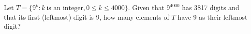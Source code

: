Let $T = \{9^k : k \ \text{is an integer}, 0 \le k \le 4000\}$.  Given that $9^{4000}$ has 3817 digits and that its first (leftmost) digit is 9, how many elements of $T$ have 9 as their leftmost digit?